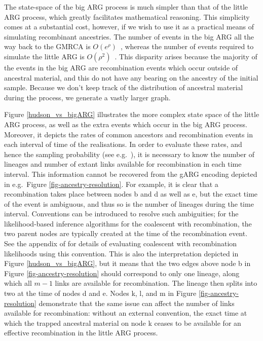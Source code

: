 \documentclass{article}
\begin{document}
The state-space of the big ARG process is much simpler than that of the little ARG process,
which greatly facilitates mathematical reasoning. This simplicity comes at a
substantial cost, however, if we wish to use it as a practical means of
simulating recombinant ancestries. 
The number of events in the big ARG all the way back to the GMRCA
is $O(e^\rho)$~\citep{griffiths1997ancestral}, whereas the number
of events required to simulate the little ARG is
$O(\rho^2)$~\citep{hein2004gene,baumdicker2021efficient}.
This disparity arises because the majority of the events in the big ARG are 
recombination events which occur outside of ancestral material,
and this do not have any bearing on the ancestry of the initial sample.
Because we don't keep track of the distribution of ancestral material during the process,
we generate a vastly larger graph.

Figure \ref{hudson_vs_bigARG} illustrates the more complex state space
of the little ARG process, as well as the extra events which occur in the big ARG process.
Moreover, it depicts the rates of common ancestors and recombination events in each
interval of time of the realisations.
In order to evaluate these rates, and hence the sampling probability
(see e.g.\ \cite[Equation (3)]{mahmoudi2022bayesian}),
it is necessary to know the number of lineages and number of extant links
available for recombination in each time interval.
This information cannot be recovered from the gARG encoding depicted in
e.g.\ Figure \ref{fig-ancestry-resolution}.
For example, it is clear that a recombination takes place between nodes \textsf{b} and
\textsf{d} as well as \textsf{e}, but the exact time of the event is ambiguous,
and thus so is the number of lineages during the time interval.
Conventions can be introduced to resolve such ambiguities;
for the likelihood-based inference algorithms for the coalescent with recombination,
the two parent nodes are typically created at the time of the recombination event.
See the appendix of \cite{baumdicker2021efficient} for details of evaluating
coalescent with recombination likelihoods using this convention.
This is also the interpretation depicted in
Figure \ref{hudson_vs_bigARG}, but it means that the two edges above node \textsf{b}
in Figure \ref{fig-ancestry-resolution} should correspond to only one lineage,
along which all $m-1$ links are available for recombination.
The lineage then splits into two at the time of nodes \textsf{d} and \textsf{e}.
Nodes \textsf{k}, \textsf{l}, and \textsf{m} in Figure \ref{fig-ancestry-resolution}
demonstrate that the same issue can affect the number of links available for recombination:
without an external convention, the exact time at which the trapped ancestral material on
node \textsf{k} ceases to be available for an effective recombination in the little ARG process.
\end{document}
